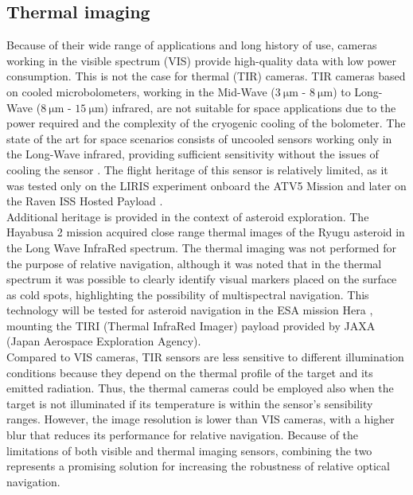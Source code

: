 \subsection{Thermal imaging}
Because of their wide range of applications and long history of use, cameras working in the visible spectrum (VIS) provide high-quality data with low power consumption. This is not the case for thermal (TIR) cameras. TIR cameras based on cooled microbolometers, working in the Mid-Wave ($\SI{3}{\micro\meter}$ - $\SI{8}{\micro\meter}$) to Long-Wave ($\SI{8}{\micro\meter}$ - $\SI{15}{\micro\meter}$) infrared, are not suitable for space applications due to the power required and the complexity of the cryogenic cooling of the bolometer. The state of the art for space scenarios consists of uncooled sensors working only in the Long-Wave infrared, providing sufficient sensitivity without the issues of cooling the sensor \cite{cassinis2019review}. 
The flight heritage of this sensor is relatively limited, as it was tested only on the LIRIS experiment onboard the ATV5 Mission \cite{cavrois2015liris} and later on the Raven ISS Hosted Payload \cite{galante2016fast}. \\
Additional heritage is provided in the context of asteroid exploration. The Hayabusa 2 mission \cite{okada2017thermal} acquired close range thermal images of the Ryugu asteroid in the Long Wave InfraRed spectrum. The thermal imaging was not performed for the purpose of relative navigation, although it was noted that in the thermal spectrum it was possible to clearly identify  visual markers placed on the surface as cold spots, highlighting the possibility of multispectral navigation. This technology will be tested  for asteroid navigation in the ESA mission Hera \cite{michel2022esa}, mounting the TIRI (Thermal InfraRed Imager) payload provided by JAXA (Japan Aerospace Exploration Agency). \\
Compared to VIS cameras, TIR sensors are less sensitive to different illumination conditions because they depend on the thermal profile of the target and its emitted radiation. Thus, the thermal cameras could be employed also when the target is not illuminated if its temperature is within the sensor's sensibility ranges. However, the image resolution is lower than VIS cameras, with a higher blur that reduces its performance for relative navigation. 
Because of the limitations of both visible and thermal imaging sensors, combining the two represents a promising solution for increasing the robustness of relative optical navigation.

